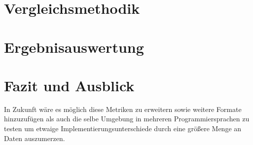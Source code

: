 \documentclass[ngerman]{seminarvorlage}
\begin{document}
\section{Vergleichsmethodik}

\section{Ergebnisauswertung}

\section{Fazit und Ausblick}

In Zukunft wäre es möglich diese Metriken zu erweitern sowie weitere Formate hinzuzufügen als auch die selbe Umgebung in mehreren Programmiersprachen zu testen um etwaige Implementierungsunterschiede durch eine größere Menge an Daten auszumerzen.

%
%


\end{document}
